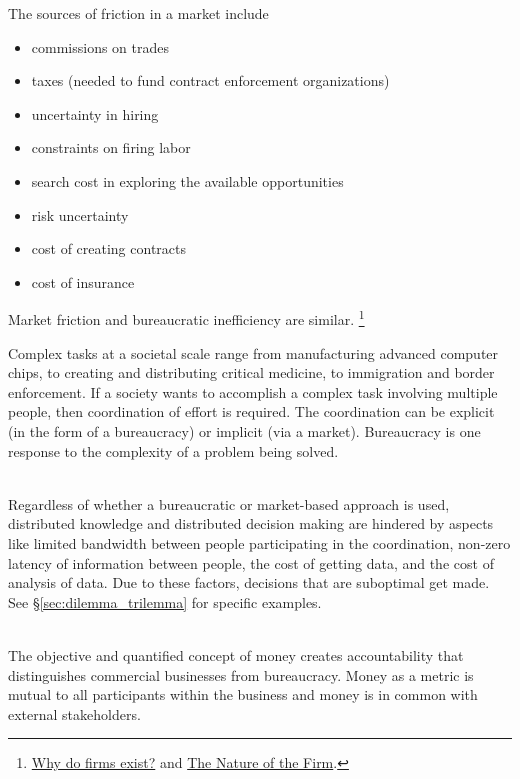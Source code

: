 The sources of friction in a market include
\begin{itemize}
    \item commissions on trades
    \item taxes (needed to fund contract enforcement organizations)
    \item uncertainty in hiring
    \item constraints on firing labor
    \item search cost in exploring the available opportunities
    \item risk uncertainty
    \item cost of creating contracts
    \item cost of insurance
\end{itemize}
Market friction and bureaucratic inefficiency are similar. \footnote{  \href{http://www.economist.com/node/17730360}{Why do firms exist?} and \href{https://en.wikipedia.org/wiki/The_Nature_of_the_Firm}{The Nature of the Firm}.}

Complex tasks at a societal scale range from manufacturing advanced computer chips, to creating and distributing critical medicine, to immigration and border enforcement. 
If a society wants to accomplish a complex task involving multiple people, then coordination of effort is required. The coordination can be explicit (in the form of a bureaucracy) or implicit (via a market).  Bureaucracy is one response to the complexity of a problem being solved.


\ \\

Regardless of whether a bureaucratic or market-based approach is used, 
distributed knowledge and distributed decision making are hindered by aspects like
limited bandwidth between people participating in the coordination,
non-zero latency of information between people,
the cost of getting data,
and
the cost of analysis of data.
Due to these factors, decisions that are suboptimal get made. See \S\ref{sec:dilemma_trilemma} for specific examples.

\ \\

The objective and quantified concept of money creates accountability that distinguishes commercial businesses from bureaucracy. Money as a metric is mutual to all participants within the business and money is in common with external stakeholders. 

